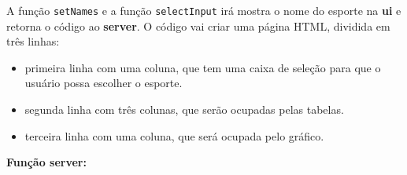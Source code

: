 \documentclass[
]{book}
\newenvironment{Shaded}{\begin{snugshade}}{\end{snugshade}}
\newcommand{\AttributeTok}[1]{\textcolor[rgb]{0.77,0.63,0.00}{#1}}
\newcommand{\DecValTok}[1]{\textcolor[rgb]{0.00,0.00,0.81}{#1}}
\newcommand{\FunctionTok}[1]{\textcolor[rgb]{0.00,0.00,0.00}{#1}}
\newcommand{\NormalTok}[1]{#1}
\newcommand{\OtherTok}[1]{\textcolor[rgb]{0.56,0.35,0.01}{#1}}
\newcommand{\SpecialCharTok}[1]{\textcolor[rgb]{0.00,0.00,0.00}{#1}}
\newcommand{\StringTok}[1]{\textcolor[rgb]{0.31,0.60,0.02}{#1}}
\providecommand{\tightlist}{%
  \setlength{\itemsep}{0pt}\setlength{\parskip}{0pt}}
\begin{document}
\begin{Shaded}
\end{Shaded}

A função \texttt{setNames} e a função \texttt{selectInput} irá mostra o nome do esporte na \textbf{ui} e retorna o código ao \textbf{server}. O código vai criar uma página HTML, dividida em três linhas:

\begin{itemize}
\tightlist
\item
  primeira linha com uma coluna, que tem uma caixa de seleção para que o usuário possa escolher o esporte.
\item
  segunda linha com três colunas, que serão ocupadas pelas tabelas.
\item
  terceira linha com uma coluna, que será ocupada pelo gráfico.
\end{itemize}

\textbf{Função server:}
\end{document}
